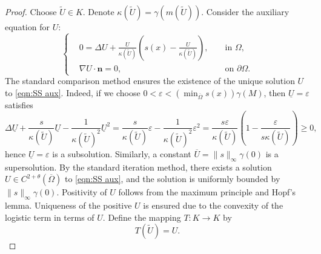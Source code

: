 \documentclass{article}
\newcommand{\eps}{\varepsilon}
\begin{document}
\begin{proof}
    Choose $\tilde U\in K$.
    Denote $\kappa(\tilde U) = \gamma(m(\tilde U))$.
    Consider the auxiliary equation for $U$:
    \begin{equation}\label{eqn:SS aux}
    \left\{\begin{aligned}
         & 0 = \Delta U +\frac{U}{\kappa(\tilde U)}\left(s(x)-\frac{U}{\kappa(\tilde U)}\right), && \text{ in }\Omega,\\
            &\nabla U\cdot \textbf{n}=0, && \text{ on }\partial\Omega.
    \end{aligned}\right.
    \end{equation} 
    The standard comparison method ensures the existence of the unique solution $U$ to \eqref{eqn:SS aux}. Indeed, if we choose $0<\eps<(\min_{\overline{\Omega}} s(x))\gamma(M)$, then $\underline U=\eps$ satisfies
    \[\Delta \underline U + \frac{s}{\kappa(\tilde U)}\underline U - \frac{1}{\kappa(\tilde U)^2}\underline U^2 = \frac{s}{\kappa(\tilde U)}\eps - \frac{1}{\kappa(\tilde U)^2}\eps^2= \frac{s\eps}{\kappa(\tilde U)}\left(1-\frac{\eps}{s\kappa(\tilde U)}\right)\ge 0,  \] hence $\underline U=\eps$ is a subsolution. Similarly, a constant $\overline U = \|s\|_\infty\gamma(0)$ is a supersolution. By the standard iteration method, there exists a solution $U\in C^{2+\theta}(\overline{\Omega})$ to \eqref{eqn:SS aux}, and the solution is uniformly bounded by $\|s\|_\infty\gamma(0)$. Positivity of $U$ follows from the maximum principle and Hopf's lemma. Uniqueness of the positive $U$ is ensured due to the convexity of the logistic term in terms of $U$.  
    Define the mapping $T:K\to K$ by
     \begin{equation*}
        T(\tilde U) = U.
    \end{equation*} 


\end{proof}
\end{document}
